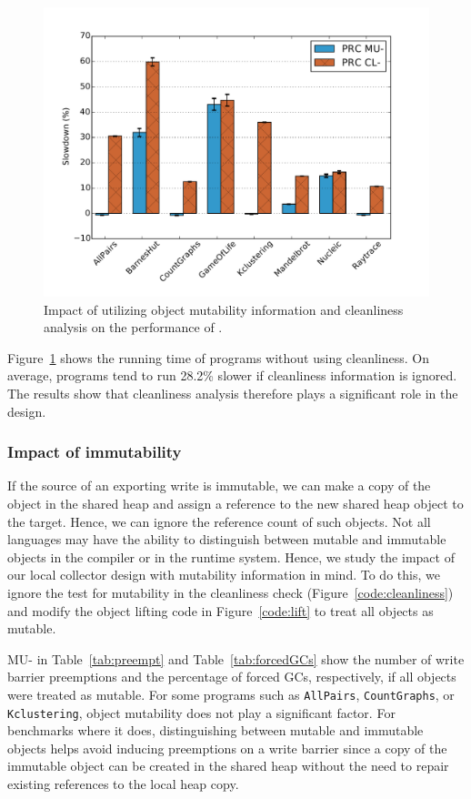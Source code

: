 \begin{figure}
  \centering
  \includegraphics[width=\textwidth]{Graphs/slowdown_cleanliness}
	\caption{Impact of utilizing object mutability information and cleanliness
	analysis on the performance of \prc.}
  \label{fig:slowdown-cleanliness}
\end{figure}

Figure~\ref{fig:slowdown-cleanliness} shows the running time of programs
without using cleanliness. On average, programs tend to run 28.2\% slower if
cleanliness information is ignored. The results show that cleanliness analysis
therefore plays a significant role in the \prc design.

\subsubsection{Impact of immutability}

If the source of an exporting write is immutable, we can make a copy of the
object in the shared heap and assign a reference to the new shared heap object
to the target. Hence, we can ignore the reference count of such objects. Not
all languages may have the ability to distinguish between mutable and immutable
objects in the compiler or in the runtime system. Hence, we study the impact of
our local collector design with mutability information in mind.  To do this, we
ignore the test for mutability in the cleanliness check
(Figure~\ref{code:cleanliness}) and modify the object lifting code in
Figure~\ref{code:lift} to treat all objects as mutable.

\prc MU- in Table~\ref{tab:preempt} and Table~\ref{tab:forcedGCs} show the
number of write barrier preemptions and the percentage of forced GCs,
respectively, if all objects were treated as mutable.  For some programs such
as {\tt AllPairs}, {\tt CountGraphs}, or {\tt Kclustering}, object mutability
does not play a significant factor.  For benchmarks where it does,
distinguishing between mutable and immutable objects helps avoid inducing
preemptions on a write barrier since a copy of the immutable object can be
created in the shared heap without the need to repair existing references to
the local heap copy.

